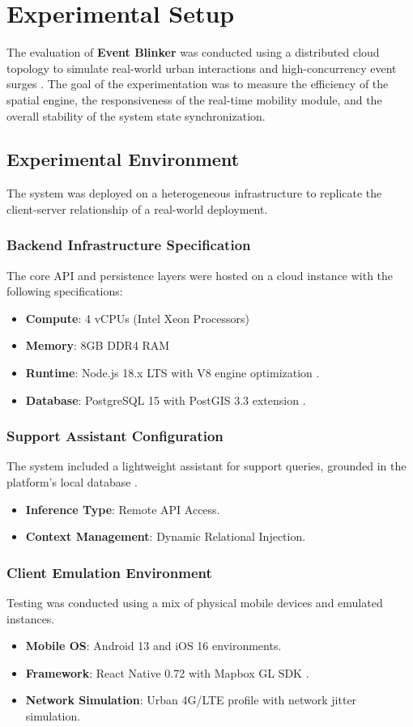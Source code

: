 \chapter{Experimental Setup}
The evaluation of \textbf{Event Blinker} was conducted using a distributed cloud topology to simulate real-world urban interactions and high-concurrency event surges \cite{nodejs}. The goal of the experimentation was to measure the efficiency of the spatial engine, the responsiveness of the real-time mobility module, and the overall stability of the system state synchronization.

\section{Experimental Environment}
The system was deployed on a heterogeneous infrastructure to replicate the client-server relationship of a real-world deployment.

\subsection{Backend Infrastructure Specification}
The core API and persistence layers were hosted on a cloud instance with the following specifications:
\begin{itemize}
    \item \textbf{Compute}: 4 vCPUs (Intel Xeon Processors)
    \item \textbf{Memory}: 8GB DDR4 RAM
    \item \textbf{Runtime}: Node.js 18.x LTS with V8 engine optimization \cite{nodejs}.
    \item \textbf{Database}: PostgreSQL 15 with PostGIS 3.3 extension \cite{postgis}.
\end{itemize}

\subsection{Support Assistant Configuration}
The system included a lightweight assistant for support queries, grounded in the platform's local database \cite{llama3}.
\begin{itemize}
    \item \textbf{Inference Type}: Remote API Access.
    \item \textbf{Context Management}: Dynamic Relational Injection.
\end{itemize}

\subsection{Client Emulation Environment}
Testing was conducted using a mix of physical mobile devices and emulated instances.
\begin{itemize}
    \item \textbf{Mobile OS}: Android 13 and iOS 16 environments.
    \item \textbf{Framework}: React Native 0.72 with Mapbox GL SDK \cite{reactnative}.
    \item \textbf{Network Simulation}: Urban 4G/LTE profile with network jitter simulation.
\end{itemize}

